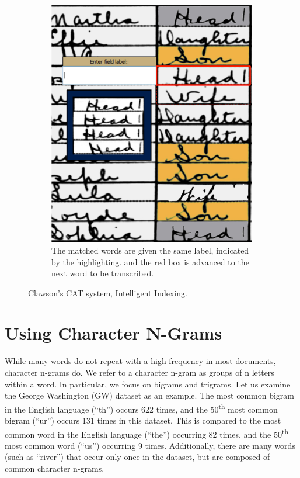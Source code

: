 \documentclass[conference]{IEEEtran}
\begin{document}
\begin{figure}
\begin{subfigure}[t]{0.23\textwidth}
    		\includegraphics[width=\textwidth]{ii_ex_new_b}
    		\caption{The matched words are given the same label, indicated by the highlighting.
    		 and the red box is advanced to the next word to be transcribed.}
    	\end{subfigure}
    	\caption{Clawson's CAT system, Intelligent Indexing.
    	}
    	\label{fig:ii}
\end{figure}

\section{Using Character N-Grams}
While many words do not repeat with a high frequency in most documents, character n-grams do. We refer to a character n-gram as groups of n letters within a word. In particular, we focus on bigrams and trigrams. Let us examine the George Washington (GW) dataset \cite{GW} as an example. The most common bigram in the English language (``th'') occurs 622 times, and the 50\textsuperscript{th} most common bigram (``ur'') occurs 131 times in this dataset. This is compared to the most common word in the English language (``the'') occurring 82 times, and the 50\textsuperscript{th} most common word (``us'') occurring 9 times. Additionally, there are many words (such as ``river'') that occur only once in the dataset, but are composed of common character n-grams. 
\end{document}
